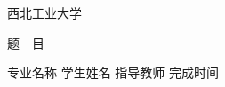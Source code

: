 \begin{titlepage}
    \voffset 2.7cm
    \begin{center}
        \begin{center}
            \begin{minipage}[c]{2.64cm}
                \centering
                \resizebox{!}{0.9cm}{ \parbox{0.54cm}{  } }
                \end{minipage}
                \hskip 0.8cm
                \begin{minipage}[c]{8cm}
                \fontsize{33}{33}\fNWPU 西北工业大学
            \end{minipage}
        \end{center}
        \vskip 0.7cm
        \sChuhao{}
        \vskip 5cm
        \begin{minipage}[c]{18cm} 
        {
        \sSanhao\fHei 题~~目 \hspace{0.7cm}%
        }
        \end{minipage}
        \vskip 1.8cm
        {
            \sSihao\fSong 专业名称
            \vskip 0.7cm
            \sSihao\fSong 学生姓名
            \vskip 0.7cm
            \sSihao\fSong 指导教师
            \vskip 0.7cm
            \sSihao\fSong 完成时间
            \vfill
        }
    \end{center}
\end{titlepage}
\fSong \normalsize

\endinput
